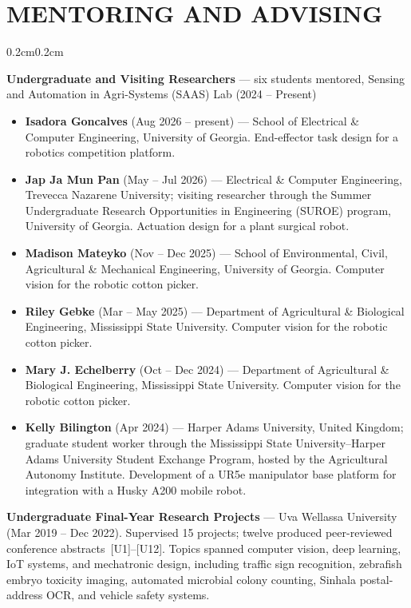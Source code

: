 \documentclass[10pt, letterpaper]{article}
\newenvironment{highlights}{%
    \begin{itemize}[topsep=0.08cm, parsep=0.08cm, partopsep=0pt,
                    itemsep=0pt, leftmargin=0.4cm + 10pt]
}{\end{itemize}}
\newenvironment{onecolentry}{%
    \begin{adjustwidth}{0.2cm}{0.2cm}
}{\end{adjustwidth}}
\begin{document}
\section{MENTORING AND ADVISING}
\vspace{0.08cm}
\begin{onecolentry}
    \textbf{Undergraduate and Visiting Researchers} --- six students mentored, Sensing
    and Automation in Agri-Systems (SAAS) Lab (2024 -- Present)
    \begin{highlights}
        \item \textbf{Isadora Goncalves} (Aug 2026 -- present) --- School of Electrical
              \& Computer Engineering, University of Georgia. End-effector task design
              for a robotics competition platform.
        \item \textbf{Jap Ja Mun Pan} (May -- Jul 2026) --- Electrical \& Computer
              Engineering, Trevecca Nazarene University; visiting researcher through
              the Summer Undergraduate Research Opportunities in Engineering (SUROE)
              program, University of Georgia. Actuation design for a plant surgical
              robot.
        \item \textbf{Madison Mateyko} (Nov -- Dec 2025) --- School of Environmental,
              Civil, Agricultural \& Mechanical Engineering, University of Georgia.
              Computer vision for the robotic cotton picker.
        \item \textbf{Riley Gebke} (Mar -- May 2025) --- Department of Agricultural \&
              Biological Engineering, Mississippi State University. Computer vision
              for the robotic cotton picker.
        \item \textbf{Mary J. Echelberry} (Oct -- Dec 2024) --- Department of
              Agricultural \& Biological Engineering, Mississippi State University.
              Computer vision for the robotic cotton picker.
        \item \textbf{Kelly Bilington} (Apr 2024) --- Harper Adams University, United
              Kingdom; graduate student worker through the Mississippi State
              University--Harper Adams University Student Exchange Program, hosted by
              the Agricultural Autonomy Institute. Development of a UR5e manipulator
              base platform for integration with a Husky A200 mobile robot.
    \end{highlights}
    \vspace{0.12cm}

    \textbf{Undergraduate Final-Year Research Projects} --- Uva Wellassa University
    (Mar 2019 -- Dec 2022). Supervised 15 projects; twelve produced peer-reviewed
    conference abstracts~[U1]--[U12]. Topics spanned computer vision, deep learning,
    IoT systems, and mechatronic design, including traffic sign recognition,
    zebrafish embryo toxicity imaging, automated microbial colony counting, Sinhala
    postal-address OCR, and vehicle safety systems.
    \vspace{0.12cm}


\end{onecolentry}
\end{document}
